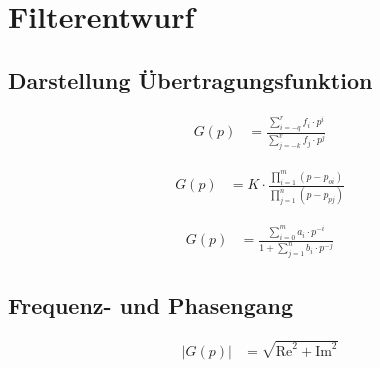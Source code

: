  
\chapter{Filterentwurf}

\section{Darstellung Übertragungsfunktion}

\begin{boxleft}
\end{boxleft}\begin{boxrightshaded}
\begin{align*}
G(p)&=\frac{\sum\limits_{i=-q}^rf_i\cdot p^i}{\sum\limits_{j=-k}^vf_j\cdot p^j}
\end{align*}
\end{boxrightshaded}

\begin{boxleft}
\end{boxleft}\begin{boxrightshaded}
\begin{align*}
G(p)&=K\cdot\frac{\prod\limits_{i=1}^m\left(p-p_{oi}\right)}{\prod\limits_{j=1}^n\left(p-p_{pj}\right)}
\end{align*}
\end{boxrightshaded}

\begin{boxleft}
\end{boxleft}\begin{boxrightshaded}
\begin{align*}
G(p)&=\frac{\sum\limits_{i=0}^m a_i\cdot p^{-i}}{1+\sum\limits_{j=1}^n b_i\cdot p^{-j}}
\end{align*}
\end{boxrightshaded}

\section{Frequenz- und Phasengang}

\begin{boxleft}
\end{boxleft}\begin{boxrightshaded}
\begin{align*}
\left|G(p)\right|&=\sqrt{\text{Re}^2+\text{Im}^2}
\end{align*}
\end{boxrightshaded}


